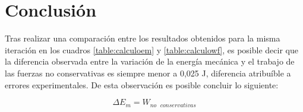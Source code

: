 \documentclass{article}
\begin{document}
\section{Conclusi\'{o}n}

Tras realizar una comparación entre los resultados obtenidos para la misma iteración en los cuadros \ref{table:calculoem} y \ref{table:calculowf}, es posible decir que la diferencia observada entre la variación de la energía mecánica y el trabajo de las fuerzas no conservativas es siempre menor a 0,025 J, diferencia atribuíble a errores experimentales. De esta observación es posible concluir lo siguiente:

\begin{equation}
\Delta E_m = W_{\text{$no$ $conservativas$}}
\end{equation}
\end{document}
